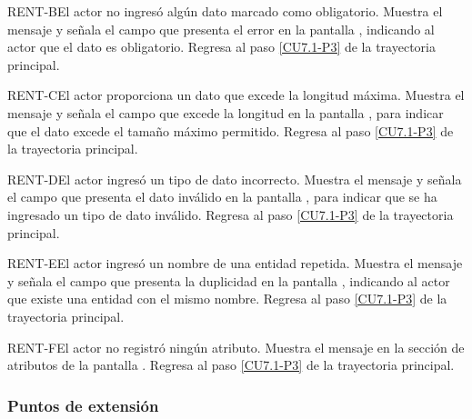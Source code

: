 	\begin{UCtrayectoriaA}{RENT-B}{El actor no ingresó algún dato marcado como obligatorio.}
		\UCpaso[\UCsist] Muestra el mensaje  y señala el campo que presenta el error en la pantalla , indicando al actor que el dato es obligatorio.
		\UCpaso Regresa al paso \ref{CU7.1-P3} de la trayectoria principal.
	\end{UCtrayectoriaA}

	\begin{UCtrayectoriaA}{RENT-C}{El actor proporciona un dato que excede la longitud máxima.}
		\UCpaso[\UCsist] Muestra el mensaje  y señala el campo que excede la longitud en la pantalla , para indicar que el dato excede el tamaño máximo permitido.
		\UCpaso Regresa al paso \ref{CU7.1-P3} de la trayectoria principal.
	\end{UCtrayectoriaA}

	\begin{UCtrayectoriaA}{RENT-D}{El actor ingresó un tipo de dato incorrecto.}
		\UCpaso[\UCsist] Muestra el mensaje  y señala el campo que presenta el dato inválido en la pantalla , para indicar que se ha ingresado un tipo de dato inválido.
		\UCpaso Regresa al paso \ref{CU7.1-P3} de la trayectoria principal.
	\end{UCtrayectoriaA}
	
	\begin{UCtrayectoriaA}{RENT-E}{El actor ingresó un nombre de una entidad repetida.}
		\UCpaso[\UCsist] Muestra el mensaje  y señala el campo que presenta la duplicidad en la pantalla , indicando al actor que existe una entidad con el mismo nombre.
		\UCpaso Regresa al paso \ref{CU7.1-P3} de la trayectoria principal.
	\end{UCtrayectoriaA}

	\begin{UCtrayectoriaA}{RENT-F}{El actor no registró ningún atributo.}
	\UCpaso[\UCsist] Muestra el mensaje  en la sección de atributos de la pantalla .
	\UCpaso Regresa al paso \ref{CU7.1-P3} de la trayectoria principal.
	\end{UCtrayectoriaA}

\subsubsection{Puntos de extensión}


